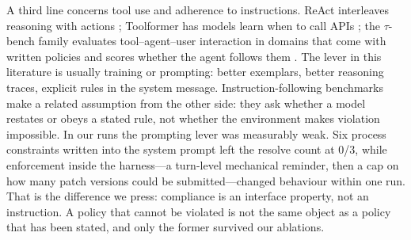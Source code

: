 A third line concerns tool use and adherence to instructions.
ReAct interleaves reasoning with actions \citep{yao2022react}; Toolformer has models learn when to call APIs \citep{schick2023toolformer}; the $\tau$-bench family evaluates tool--agent--user interaction in domains that come with written policies and scores whether the agent follows them \citep{yao2024taubench}.
The lever in this literature is usually training or prompting: better exemplars, better reasoning traces, explicit rules in the system message.
Instruction-following benchmarks make a related assumption from the other side: they ask whether a model restates or obeys a stated rule, not whether the environment makes violation impossible.
In our runs the prompting lever was measurably weak.
Six process constraints written into the system prompt left the resolve count at 0/3, while enforcement inside the harness---a turn-level mechanical reminder, then a cap on how many patch versions could be submitted---changed behaviour within one run.
That is the difference we press: compliance is an interface property, not an instruction.
A policy that cannot be violated is not the same object as a policy that has been stated, and only the former survived our ablations.

